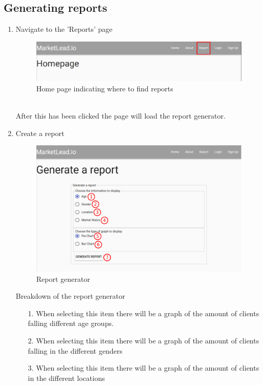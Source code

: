 \documentclass{article}
\begin{document}
		\subsection{Generating reports}
			\begin{enumerate}
				\item Navigate to the 'Reports' page
					\begin{figure}
						\centering
							\includegraphics[width=\textwidth]{images/home_reports.png}
						\caption{Home page indicating where to find reports}
						\label{fig:homeReports}
					\end{figure}\\
					After this has been clicked the page will load the report generator.
				\item Create a report
					\begin{figure}
						\centering
							\includegraphics[width=\textwidth]{images/generate_report.png}
						\caption{Report generator}
						\label{fig:reportGenerator}
					\end{figure}
					Breakdown of the report generator
					\begin{itemize}
						\item[1.] When selecting this item there will be a graph of the amount of clients falling different age groups.
						\item[2.] When selecting this item there will be a graph of the amount of clients falling in the different genders
						\item[3.] When selecting this item there will be a graph of the amount of clients in the different locations

\end{itemize}
\end{enumerate}
\end{document}
